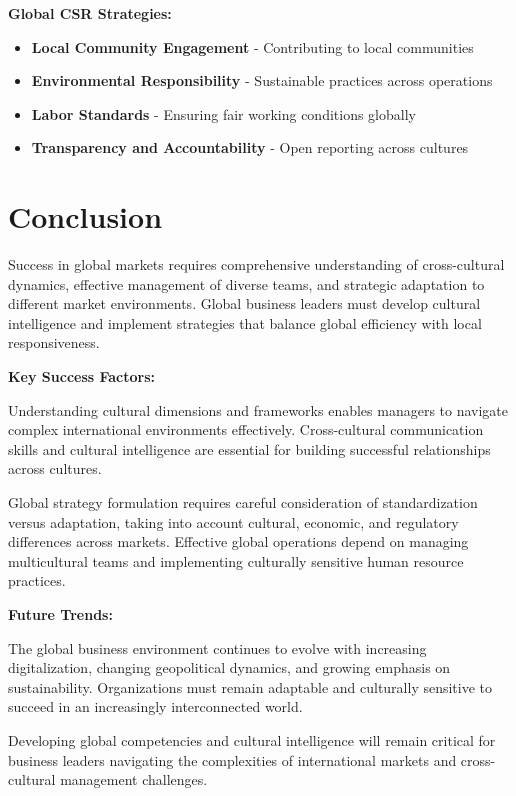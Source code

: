 \documentclass[12pt]{article}
\begin{document}
\textbf{Global CSR Strategies:}
\begin{itemize}
    \item \textbf{Local Community Engagement} - Contributing to local communities
    \item \textbf{Environmental Responsibility} - Sustainable practices across operations
    \item \textbf{Labor Standards} - Ensuring fair working conditions globally
    \item \textbf{Transparency and Accountability} - Open reporting across cultures
\end{itemize}

\section{Conclusion}

Success in global markets requires comprehensive understanding of cross-cultural dynamics, effective management of diverse teams, and strategic adaptation to different market environments. Global business leaders must develop cultural intelligence and implement strategies that balance global efficiency with local responsiveness.

\textbf{Key Success Factors:}

Understanding cultural dimensions and frameworks enables managers to navigate complex international environments effectively. Cross-cultural communication skills and cultural intelligence are essential for building successful relationships across cultures.

Global strategy formulation requires careful consideration of standardization versus adaptation, taking into account cultural, economic, and regulatory differences across markets. Effective global operations depend on managing multicultural teams and implementing culturally sensitive human resource practices.

\textbf{Future Trends:}

The global business environment continues to evolve with increasing digitalization, changing geopolitical dynamics, and growing emphasis on sustainability. Organizations must remain adaptable and culturally sensitive to succeed in an increasingly interconnected world.

Developing global competencies and cultural intelligence will remain critical for business leaders navigating the complexities of international markets and cross-cultural management challenges.
\end{document}
